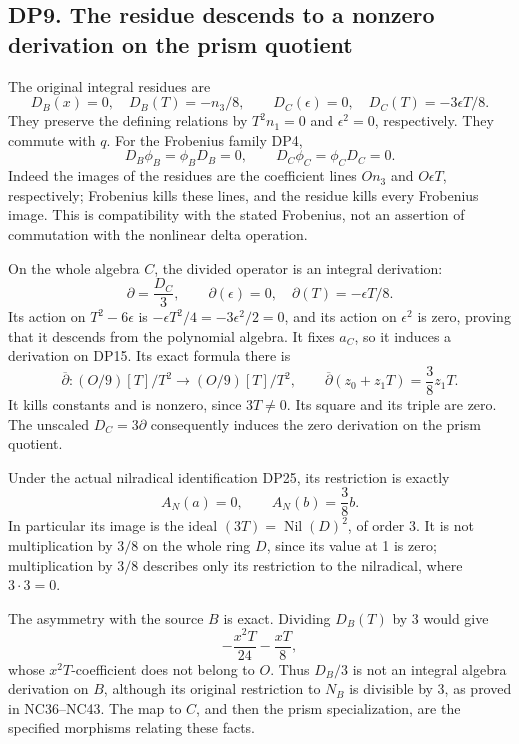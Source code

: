 \documentclass[
  10pt,
  a4paper,
]{article}
\begin{document}
\subsection{DP9. The residue descends to a nonzero derivation on the
prism
quotient}\label{dp9.-the-residue-descends-to-a-nonzero-derivation-on-the-prism-quotient}

The original integral residues are \[
D_B(x)=0,\quad D_B(T)=-n_3/8,\qquad
D_C(\epsilon)=0,\quad D_C(T)=-3\epsilon T/8.
\tag{DP37}
\] They preserve the defining relations by \(T^2n_1=0\) and
\(\epsilon^2=0\), respectively. They commute with \(q\). For the
Frobenius family DP4, \[
D_B\phi_B=\phi_BD_B=0,\qquad
D_C\phi_C=\phi_CD_C=0.
\] Indeed the images of the residues are the coefficient lines \(On_3\)
and \(O\epsilon T\), respectively; Frobenius kills these lines, and the
residue kills every Frobenius image. This is compatibility with the
stated Frobenius, not an assertion of commutation with the nonlinear
delta operation.

On the whole algebra \(C\), the divided operator is an integral
derivation: \[
\partial=\frac{D_C}{3},\qquad
\partial(\epsilon)=0,\quad\partial(T)=-\epsilon T/8.
\tag{DP38}
\] Its action on \(T^2-6\epsilon\) is
\(-\epsilon T^2/4=-3\epsilon^2/2=0\), and its action on \(\epsilon^2\)
is zero, proving that it descends from the polynomial algebra. It fixes
\(a_C\), so it induces a derivation on DP15. Its exact formula there is
\[
\overline\partial:(O/9)[T]/T^2\longrightarrow(O/9)[T]/T^2,
\qquad
\overline\partial(z_0+z_1T)=\frac38z_1T.
\tag{DP39}
\] It kills constants and is nonzero, since \(3T\ne0\). Its square and
its triple are zero. The unscaled \(D_C=3\partial\) consequently induces
the zero derivation on the prism quotient.

Under the actual nilradical identification DP25, its restriction is
exactly \[
A_N(a)=0,\qquad A_N(b)=\frac38b.
\tag{DP40}
\] In particular its image is the ideal
\((3T)=\operatorname{Nil}(D)^2\), of order 3. It is not multiplication
by \(3/8\) on the whole ring \(D\), since its value at 1 is zero;
multiplication by \(3/8\) describes only its restriction to the
nilradical, where \(3\cdot3=0\).

The asymmetry with the source \(B\) is exact. Dividing \(D_B(T)\) by 3
would give \[
-\frac{x^2T}{24}-\frac{xT}{8},
\] whose \(x^2T\)-coefficient does not belong to \(O\). Thus \(D_B/3\)
is not an integral algebra derivation on \(B\), although its original
restriction to \(N_B\) is divisible by 3, as proved in NC36--NC43. The
map to \(C\), and then the prism specialization, are the specified
morphisms relating these facts.
\end{document}
